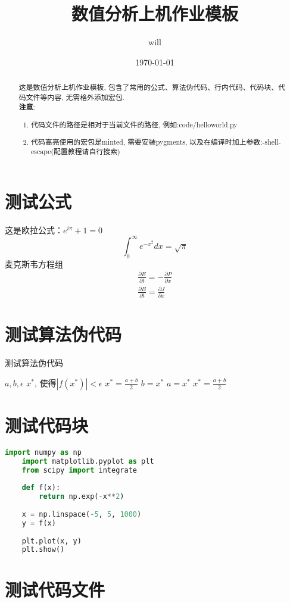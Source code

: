 \documentclass[11pt,a4paper]{TGNAN}
\title{\textbf{数值分析上机作业模板}}
\author{will}
\date{\today}
\begin{document}
\maketitle
\begin{abstract}
    这是数值分析上机作业模板, 包含了常用的公式、算法伪代码、行内代码、代码块、代码文件等内容, 无需格外添加宏包.\\
    \textbf{注意}:
    \begin{enumerate}
        \item 代码文件的路径是相对于当前文件的路径, 例如:code/helloworld.py
        \item 代码高亮使用的宏包是minted, 需要安装pygments, 以及在编译时加上参数:-shell-escape(配置教程请自行搜索)
    \end{enumerate}
\end{abstract}
\section{测试公式}
这是欧拉公式：$e^{i\pi}+1=0$
$$
\int_{0}^{\infty} e^{-x^2} dx = \sqrt{\pi}
$$
麦克斯韦方程组
$$
\begin{aligned}
    \frac{\partial E}{\partial t} = -\frac{\partial P}{\partial x} \\
\frac{\partial B}{\partial t} = \frac{\partial J}{\partial x}
\end{aligned}
$$
\newpage
\section{测试算法伪代码}
\begin{algorithm}
\caption{测试算法伪代码}
\begin{algorithmic}
\REQUIRE $a, b, \epsilon$
\ENSURE $x^*$, 使得$|f(x^*)| < \epsilon$
\STATE $x^* = \frac{a + b}{2}$
\STATE $b = x^*$
\ELSE
\STATE $a = x^*$
\ENDIF
\STATE $x^* = \frac{a + b}{2}$
\ENDWHILE
\end{algorithmic}
\end{algorithm}

\section{测试代码块}

\begin{lstlisting}[language=Python]
    import numpy as np
    import matplotlib.pyplot as plt
    from scipy import integrate
    
    def f(x):
        return np.exp(-x**2)
    
    x = np.linspace(-5, 5, 1000)
    y = f(x)
    
    plt.plot(x, y)
    plt.show()
\end{lstlisting}

\newpage

\section{测试代码文件}


\end{document}
